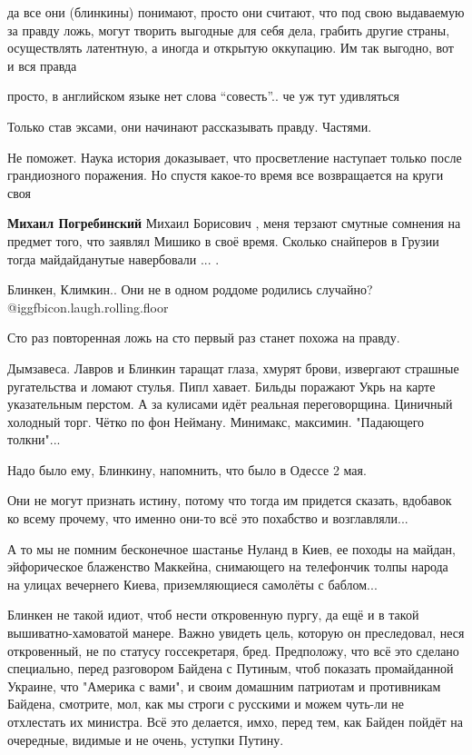 \begin{itemize}

да все они (блинкины) понимают, просто они считают, что под свою выдаваемую за
правду ложь, могут творить выгодные для себя дела, грабить другие страны,
осуществлять латентную, а иногда и открытую оккупацию. Им так выгодно, вот и
вся правда


просто, в английском языке нет слова \enquote{совесть}.. че уж тут удивляться

Только став эксами, они начинают рассказывать правду. Частями.

Не поможет. Наука история доказывает, что просветление наступает только после грандиозного поражения. Но спустя какое-то время все возвращается на круги своя

\textbf{Михаил Погребинский} Михаил Борисович , меня терзают смутные сомнения на предмет того, что заявлял Мишико в своё время. Сколько снайперов в Грузии тогда майдайданутые навербовали
... .

Блинкен, Климкин.. Они не в одном роддоме родились случайно? @igg{fbicon.laugh.rolling.floor} 

Сто раз повторенная ложь на сто первый раз станет похожа на правду.


Дымзавеса. Лавров и Блинкин таращат глаза, хмурят брови, извергают страшные
ругательства и ломают стулья. Пипл хавает. Бильды поражают Укрь на карте
указательным перстом. А за кулисами идёт реальная переговорщина. Циничный
холодный торг. Чётко по фон Нейману. Минимакс, максимин. "Падающего толкни"...


Надо было ему, Блинкину, напомнить, что было в Одессе 2 мая.


Они не могут признать истину, потому что тогда им придется сказать, вдобавок ко
всему прочему, что именно они-то всё это похабство и возглавляли...

А то мы не помним бесконечное шастанье Нуланд в Киев, ее походы на майдан,
эйфорическое блаженство Маккейна, снимающего на телефончик толпы народа на
улицах вечернего Киева, приземляющиеся самолёты с баблом...


Блинкен не такой идиот, чтоб нести откровенную пургу, да ещё и в такой
вышиватно-хамоватой манере. Важно увидеть цель, которую он преследовал, неся
откровенный, не по статусу госсекретаря, бред. Предположу, что всё это сделано
специально, перед разговором Байдена с Путиным, чтоб показать промайданной
Украине, что "Америка с вами", и своим домашним патриотам и противникам
Байдена, смотрите, мол, как мы строги с русскими и можем чуть-ли не отхлестать
их министра. Всё это делается, имхо, перед тем, как Байден пойдёт на очередные,
видимые и не очень, уступки Путину.


\end{itemize}
